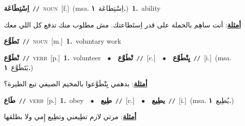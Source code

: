 \documentclass[10pt,a4paper,twoside]{article} %
\begin{document}
\begin{multicols}{2}
{\setlength\topsep{0pt}\textbf{\foreignlanguage{arabic}{اِسْتِطَاعَة}}\ {\color{gray}\texttt{//}\color{black}}\ \textsc{noun}\ [f.]\ \color{gray}(msa. \foreignlanguage{arabic}{اِسْتِطاعَة}~\foreignlanguage{arabic}{\textbf{١.}})\color{black}\ \textbf{1.}~ability\  \begin{flushright}\color{gray}\foreignlanguage{arabic}{\textbf{\underline{\foreignlanguage{arabic}{أمثلة}}}: أنت ساهِم بالحملة على قدر اِستَطاعتك. مش مطلوب منك تدفع كل اللي معك}\end{flushright}\color{black}} \vspace{2mm}

{\setlength\topsep{0pt}\textbf{\foreignlanguage{arabic}{تَطَوُّع}}\ {\color{gray}\texttt{//}\color{black}}\ \textsc{noun}\ [m.]\ \textbf{1.}~voluntary work\ } \vspace{2mm}

{\setlength\topsep{0pt}\textbf{\foreignlanguage{arabic}{تْطَوَّع}}\ {\color{gray}\texttt{//}\color{black}}\ \textsc{verb}\ [p.]\ \textbf{1.}~volunteer\ \ $\bullet$\ \ \setlength\topsep{0pt}\textbf{\foreignlanguage{arabic}{تْطَوَّع}}\ {\color{gray}\texttt{//}\color{black}}\ [c.]\ \ $\bullet$\ \ \setlength\topsep{0pt}\textbf{\foreignlanguage{arabic}{يِتْطَوَّع}}\ {\color{gray}\texttt{//}\color{black}}\ [i.]\ \color{gray}(msa. \foreignlanguage{arabic}{يَتَطَوَّع}~\foreignlanguage{arabic}{\textbf{١.}})\color{black}\  \begin{flushright}\color{gray}\foreignlanguage{arabic}{\textbf{\underline{\foreignlanguage{arabic}{أمثلة}}}: بدهمي يِتْطَوَّعوا بالمخيم الصيفي تبع الطيرة؟}\end{flushright}\color{black}} \vspace{2mm}

{\setlength\topsep{0pt}\textbf{\foreignlanguage{arabic}{طَاع}}\ {\color{gray}\texttt{//}\color{black}}\ \textsc{verb}\ [p.]\ \textbf{1.}~obey\ \ $\bullet$\ \ \setlength\topsep{0pt}\textbf{\foreignlanguage{arabic}{طِيع}}\ {\color{gray}\texttt{//}\color{black}}\ [c.]\ \ $\bullet$\ \ \setlength\topsep{0pt}\textbf{\foreignlanguage{arabic}{يطِيع}}\ {\color{gray}\texttt{//}\color{black}}\ [i.]\ \color{gray}(msa. \foreignlanguage{arabic}{يُطِيع}~\foreignlanguage{arabic}{\textbf{١.}})\color{black}\  \begin{flushright}\color{gray}\foreignlanguage{arabic}{\textbf{\underline{\foreignlanguage{arabic}{أمثلة}}}: مرتي لازم تطِيعني وتطِيع إِمي ولا بطلقها}\end{flushright}\color{black}} \vspace{2mm}


\end{multicols}
\end{document}
